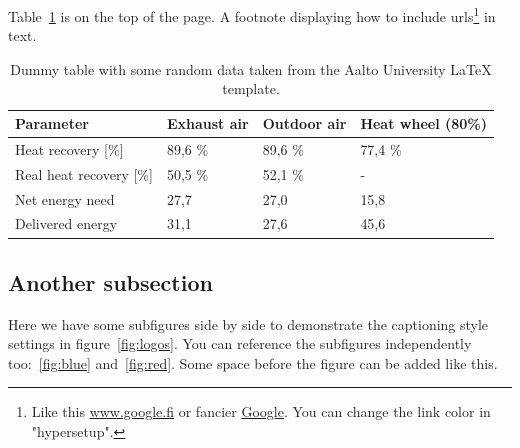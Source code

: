 \documentclass[12pt, a4paper, oneside]{article}
\begin{document}
\blindtext[2]

Table~\ref{tab:example} is on the top of the page. A footnote displaying how to include urls\footnote{Like this \url{www.google.fi} or fancier \href{www.google.fi}{Google}.
    You can change the link color in "hypersetup".} in text.

\begin{table}[t]
    \centering
    \caption[Dummy table]{Dummy table with some random data taken from the Aalto University LaTeX template.}
    \begin{tabularx}{\textwidth}{Xlll}
        \toprule
        \textbf{Parameter}      & \textbf{Exhaust air} & \textbf{Outdoor air} & \textbf{Heat wheel (80\%)} \\
        \midrule
        Heat recovery [\%]      & 89,6 \%              & 89,6 \%              & 77,4 \%                    \\
        Real heat recovery [\%] & 50,5 \%              & 52,1 \%              & -                          \\
        Net energy need         & 27,7                 & 27,0                 & 15,8                       \\
        Delivered energy        & 31,1                 & 27,6                 & 45,6                       \\
        \bottomrule
    \end{tabularx}
    \label{tab:example}
\end{table}

\subsection{Another subsection} \label{subsec:another-subsection}

Here we have some subfigures side by side to demonstrate the captioning style settings in figure~\ref{fig:logos}.
You can reference the subfigures independently too:~\ref{fig:blue} and~\ref{fig:red}.
Some space before the figure can be added like this. \medskip
\end{document}
